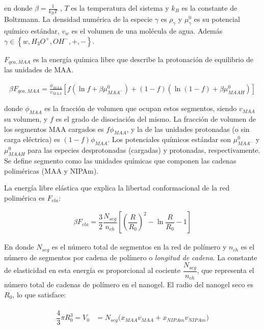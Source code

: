 	\noindent en donde  $\beta=\frac{1}{k_BT}$ , $T$ es la temperatura del sistema  y  $k_B$ es la constante de Boltzmann. La densidad num\'erica de la especie $\gamma$ es $\rho_\gamma$ y $\mu^0_\gamma$ es su potencial qu\'imico est\'andar,  $v_w$ es el volumen de una mol\'ecula de agua. Adem\'as $\gamma \in \left\{ w, H_3O^+, OH^-, +,- \right\}$.
	
	$F_{qca,MAA}$ es la energ\'ia qu\'imica libre que describe la protonaci\'on de equilibrio de las unidades de MAA.
	
	
	\begin{align}
		\beta F_{qca, MAA} =  \frac{\phi_{MAA}}{v_{MAA}} \left[f(\ln f+ \beta\mu^0_{MAA^-}) +(1-f)(\ln (1-f)+\beta\mu^0_{MAAH})\right]
	\end{align}
	
	
	\noindent donde $\phi_{MAA}$ es la fracci\'on de volumen que ocupan estos segmentos, siendo $v_{MAA}$ su volumen, y $f$ es el grado de disociaci\'on del mismo. 
	La fracci\'on de volumen de los segmentos MAA cargados es $f\phi_{MAA}$, y la de las unidades protonadas (o sin carga el\'ectrica) es $(1-f)\phi_{MAA}$.
	Los potenciales qu\'imicos est\'andar son $\mu^0_{MAA^-}$ y $\mu^0_{MAAH}$ para las especies desprotonadas (cargadas) y protonadas, respectivamente.
	Se define segmento como las unidades qu\'imicas que componen las cadenas polim\'ericas (MAA y NIPAm).
	
	
	La energ\'ia libre el\'astica que explica la libertad conformacional de la red polim\'erica es $F_{ela}$: 
	
	\begin{align}
		\beta F_{ela} = \dfrac{3}{2}\dfrac{N_{seg}}{n_{ch} }\left[\left(\dfrac{R}{R_0}\right)^2 - \ln\dfrac{R}{R_0} -1\right]
	\end{align}
	
	En donde $N_{seg}$ es el n\'umero total de segmentos en la red de pol\'imero y $n_{ch}$ es el n\'umero de segmentos por cadena de pol\'imero o \emph{longitud de cadena}.
	La constante de elasticidad en esta energ\'ia es proporcional al cociente $\dfrac{N_{seg}}{n_{ch}}$, que representa el n\'umero total de cadenas de pol\'imero en el nanogel.
	El radio del nanogel seco es $R_0$, lo que satisface:
	
	\begin{align}
		\begin{aligned} 
			\dfrac{4}{3}\pi R_0^3=V_0&=N_{seg}\Big( x_{MAA} v_{MAA} +x_{NIPAm} v_{NIPAm}\Big)
		\end{aligned}
	\end{align}
	
